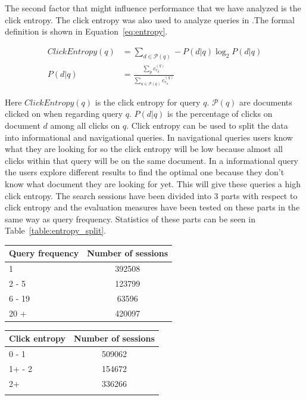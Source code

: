 The second factor that might influence performance that we have analyzed is the click entropy. The click entropy was also used to analyze queries in \cite{dou2008}.The formal definition is shown in Equation~\ref{eq:entropy}.

\begin{align}
	ClickEntropy(q) &= \sum_{d \in \mathcal{P}(q)} - P(d|q) \log_2 P(d|q) \label{eq:entropy} \\
	P(d|q) &= \frac{\sum_p c_{r_d}^{(q)}}{\sum_{u \in \mathcal{P}(q)} c_{r_u}^{(q)}} \label{eq:entropy_2}
\end{align}

Here $ClickEntropy(q)$ is the click entropy for query $q$. $\mathcal{P}(q)$ are documents clicked on when regarding query $q$. $P(d|q)$ is the percentage of clicks on document $d$ among all clicks on $q$.  Click entropy can be used to split the data into informational and navigational queries. In navigational queries users know what they are looking for so the click entropy will be low because almost all clicks within that query will be on the same document. In a informational query the users explore different results to find the optimal one because they don't know what document they are looking for yet. This will give these queries a high click entropy.
The search sessions have been divided into 3 parts with respect to click entropy and the evaluation measures have been tested on these parts in the same way as query frequency. Statistics of these parts can be seen in Table~\ref{table:entropy_split}.
\\

\begin{minipage}[b]{.45\textwidth}
	\centering
\begin{tabular}{lc}
\hline
Query frequency & Number of sessions \\ \midrule
1               & 392508            \\ 
2 - 5           & 123799            \\ 
6 - 19          & 63596             \\ 
20 +            & 420097            \\ \bottomrule
\end{tabular}
\label{table:query_split}
\end{minipage}
\qquad
\begin{minipage}[b]{.45\textwidth}
	\centering
\begin{tabular}{lc}
\toprule
Click entropy & Number of sessions \\ \midrule
0 - 1         & 509062             \\ 
1+ - 2        & 154672             \\ 
2+            & 336266             \\ \bottomrule \\
\end{tabular}
\label{table:entropy_split}
\end{minipage}

